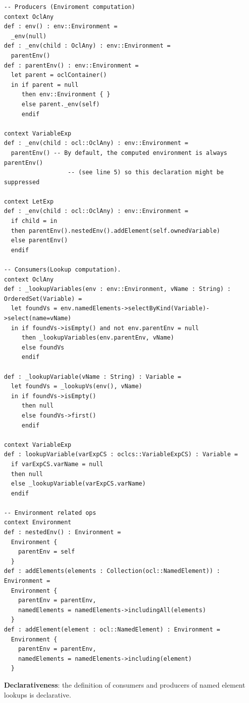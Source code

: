 \documentclass{llncs}
\begin{document}
\begin{lstlisting}[caption=Name resolution description for running example, label=lst:exampleNameResodesc, language=OCL]
-- Producers (Enviroment computation)
context OclAny
def : env() : env::Environment =
  _env(null)
def : _env(child : OclAny) : env::Environment =
  parentEnv()	
def : parentEnv() : env::Environment =
  let parent = oclContainer() 
  in if parent = null 
     then env::Environment { } 
     else parent._env(self) 
     endif
	
context VariableExp
def : _env(child : ocl::OclAny) : env::Environment =
  parentEnv() -- By default, the computed environment is always parentEnv()
                  -- (see line 5) so this declaration might be suppressed
    
context LetExp
def : _env(child : ocl::OclAny) : env::Environment =
  if child = in
  then parentEnv().nestedEnv().addElement(self.ownedVariable)
  else parentEnv()
  endif

-- Consumers(Lookup computation).
context OclAny 
def : _lookupVariables(env : env::Environment, vName : String) : OrderedSet(Variable) =  	
  let foundVs = env.namedElements->selectByKind(Variable)->select(name=vName) 
  in if foundVs->isEmpty() and not env.parentEnv = null
     then _lookupVariables(env.parentEnv, vName)
     else foundVs 
     endif
     
def : _lookupVariable(vName : String) : Variable =
  let foundVs = _lookupVs(env(), vName)
  in if foundVs->isEmpty()
     then null
     else foundVs->first() 
     endif
     
context VariableExp
def : lookupVariable(varExpCS : oclcs::VariableExpCS) : Variable =
  if varExpCS.varName = null
  then null 
  else _lookupVariable(varExpCS.varName) 
  endif
         
-- Environment related ops
context Environment
def : nestedEnv() : Environment = 
  Environment { 
    parentEnv = self
  }
def : addElements(elements : Collection(ocl::NamedElement)) : Environment =
  Environment {
    parentEnv = parentEnv,
    namedElements = namedElements->includingAll(elements)
  }
def : addElement(element : ocl::NamedElement) : Environment =
  Environment {
    parentEnv = parentEnv,
    namedElements = namedElements->including(element)
  }
\end{lstlisting}

\textbf{Declarativeness}: the definition of consumers and producers of named element lookups is declarative.
\end{document}
